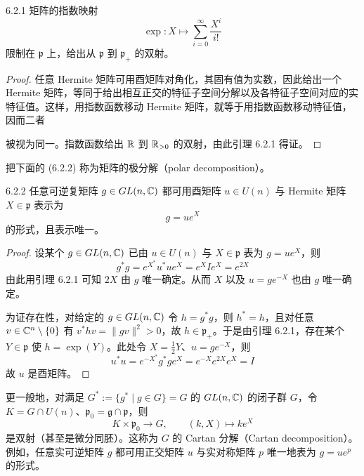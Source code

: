 \begin{lemma*}{6.2.1}
矩阵的指数映射
\begin{equation}
  \exp\colon X\mapsto\sum_{i=0}^{\infty}\frac{X^i}{i!}
  \tag{6.2.1}
\end{equation}
限制在 $\mathfrak{p}$ 上，给出从 $\mathfrak{p}$ 到 $\mathfrak{p}_+$ 的双射。
\end{lemma*}

\begin{proof}
任意 Hermite 矩阵可用酉矩阵对角化，其固有值为实数，因此给出一个 Hermite 矩阵，等同于给出相互正交的特征子空间分解以及各特征子空间对应的实特征值。这样，用指数函数移动 Hermite 矩阵，就等于用指数函数移动特征值，因而二者

被视为同一。指数函数给出 $\mathbb{R}$ 到 $\mathbb{R}_{>0}$ 的双射，由此引理 6.2.1 得证。
\end{proof}

把下面的 (6.2.2) 称为矩阵的极分解（polar decomposition）。

\begin{theorem*}{6.2.2}
任意可逆复矩阵 $g\in GL(n,\mathbb{C})$ 都可用酉矩阵 $u\in U(n)$ 与 Hermite 矩阵 $X\in\mathfrak{p}$ 表示为
\begin{equation}
  g=ue^X
  \tag{6.2.2}
\end{equation}
的形式，且表示唯一。
\end{theorem*}

\begin{proof}
设某个 $g\in GL(n,\mathbb{C})$ 已由 $u\in U(n)$ 与 $X\in\mathfrak{p}$ 表为 $g=ue^X$，则
\begin{equation}
  g^*g=e^{X^*}u^*ue^X=e^X Ie^X=e^{2X}
  \tag{6.2.3}
\end{equation}
由此用引理 6.2.1 可知 $2X$ 由 $g$ 唯一确定。从而 $X$ 以及 $u=ge^{-X}$ 也由 $g$ 唯一确定。

为证存在性，对给定的 $g\in GL(n,\mathbb{C})$ 令 $h=g^*g$，则 $h^*=h$，且对任意 $v\in\mathbb{C}^n\setminus\{0\}$ 有 $v^*hv=\|gv\|^2>0$，故 $h\in\mathfrak{p}_+$。于是由引理 6.2.1，存在某个 $Y\in\mathfrak{p}$ 使 $h=\exp(Y)$。此处令 $X=\frac12Y$、$u=ge^{-X}$，则
\begin{equation}
  u^*u=e^{-X^*}g^*ge^X=e^{-X}e^{2X}e^X=I
  \tag{6.2.4}
\end{equation}
故 $u$ 是酉矩阵。
\end{proof}

更一般地，对满足 $G^*:=\{g^*\mid g\in G\}=G$ 的 $GL(n,\mathbb{C})$ 的闭子群 $G$，令 $K=G\cap U(n)$、$\mathfrak{p}_0=\mathfrak{g}\cap\mathfrak{p}$，则
\begin{equation}
  K\times\mathfrak{p}_0\to G,\qquad (k,X)\mapsto ke^X
  \tag{6.2.5}
\end{equation}
是双射（甚至是微分同胚）。这称为 $G$ 的 Cartan 分解（Cartan decomposition）。例如，任意实可逆矩阵 $g$ 都可用正交矩阵 $u$ 与实对称矩阵 $p$ 唯一地表为 $g=ue^p$ 的形式。

